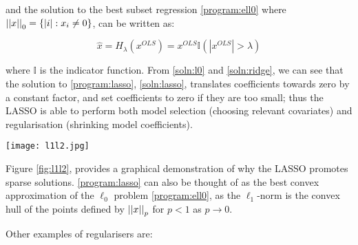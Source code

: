 and the solution to the best subset regression \eqref{program:ell0} where \( \left|\left|x\right|\right|_0 = \{ |i| : x_i \neq 0 \} \), can be written as:

\begin{equation}
\hat{x} = H_{\lambda}\left(x^{OLS}\right) = x^{OLS} \mathbb{I}\left(|x^{OLS}| > \lambda\right)
\label{soln:l0}
\end{equation} 

where \(\mathbb{I}\) is the indicator function. From \eqref{soln:l0} and \eqref{soln:ridge}, we can see that the solution to \eqref{program:lasso}, \eqref{soln:lasso}, translates coefficients towards zero by a constant factor, and set coefficients to zero if they are too small; thus the LASSO is able to perform both model selection (choosing relevant covariates) and regularisation (shrinking model coefficients). 

\begin{example}


\end{example}

\begin{figure*}[h]
\centering
\texttt{[image: l1l2.jpg]}
\caption{Solutions to the Compressive Sensing optimisation problem intersect the \(l_1\) norm the points where all components (but one) of the vector are zero (i.e. it is sparsity promoting) \cite{Tibshirani1996}}
\label{fig:l1l2}
\end{figure*}

Figure \ref{fig:l1l2}, provides a graphical demonstration of why the LASSO promotes sparse solutions. \eqref{program:lasso} can also be thought of as the best convex approximation of the \(\ell_0\) problem \eqref{program:ell0}, as the \(\ell_1\)-norm is the convex hull of the points defined by \(\left|\left|x\right|\right|_p\) for \(p < 1\) as \(p \rightarrow 0\). 

Other examples of regularisers are:

